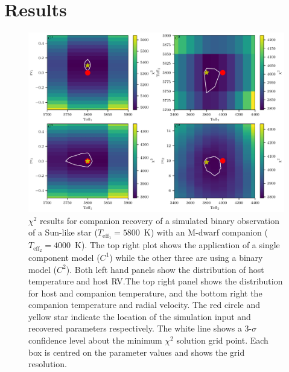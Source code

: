 \documentclass[fleqn,usenatbib]{mnras}
\begin{document}
    \section{Results}
    \label{sec:results}
    
    
    
    \begin{figure}
        \centering
        \includegraphics[width=0.8\hsize]{images/fig3.pdf}
        
        \caption{\(\chi^2\) results for companion recovery of a simulated binary observation of a Sun-like star (\(T_{\textrm{eff}_1}=5800\)~K) with an M-dwarf companion (\(T_{\textrm{eff}_2}=4000\)~K). The top right plot shows the application of a single component model (\(C^1\)) while the other three are using a binary model (\(C^2\)). Both left hand panels show the distribution of host temperature and host RV.\@ The top right panel shows the distribution for host and companion temperature, and the bottom right the companion temperature and radial velocity.
        The red circle and yellow star indicate the location of the simulation input and recovered parameters respectively.
        The white line shows a 3-\(\sigma\) confidence level about the minimum \(\chi^2\) solution grid point. Each box is centred on the parameter values and shows the grid resolution.}
        \label{fig:Mdwarf_contours}
    \end{figure}
    
\end{document}
